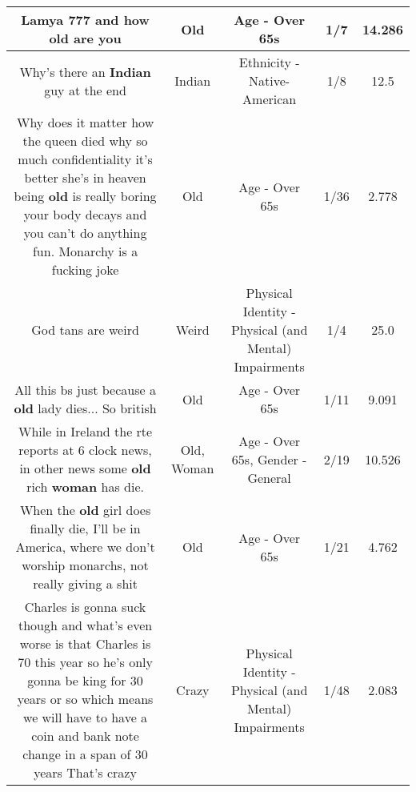 \documentclass[11pt]{article}
\newlength\mylength
\begin{document}
\begin{center}
\begin{longtable}{|C{.65\mylength}|C{.30\mylength}|C{.12\mylength}|C{.12\mylength}|C{.12\mylength}|}
  \small Lamya 777 and how \textbf{old} are you\normalsize   & Old & Age - Over 65s & 1/7 & 14.286 \\  \hline
  \small Why's there an \textbf{Indian} guy at the end\normalsize   & Indian & Ethnicity - Native-American & 1/8 & 12.5 \\  \hline
  \small Why does it matter how the queen died why so much confidentiality it's better she's in heaven being \textbf{old} is really boring your body decays and you can't do anything fun. Monarchy is a fucking joke\normalsize   & Old & Age - Over 65s & 1/36 & 2.778 \\  \hline
  \small God tans are weird\normalsize   & Weird & Physical Identity - Physical (and Mental) Impairments & 1/4 & 25.0 \\  \hline
  \small All this bs just because a \textbf{old} lady dies... So british\normalsize   & Old & Age - Over 65s & 1/11 & 9.091 \\  \hline
  \small While in Ireland the rte reports at 6 clock news, in other news some \textbf{old} rich \textbf{woman} has die.\normalsize   & Old, Woman & Age - Over 65s, Gender - General & 2/19 & 10.526 \\  \hline
  \small When the \textbf{old} girl does finally die, I'll be in America, where we don't worship monarchs, not really giving a shit\normalsize   & Old & Age - Over 65s & 1/21 & 4.762 \\  \hline
  \small Charles is gonna suck though and what's even worse is that Charles is 70 this year so he's only gonna be king for 30 years or so which means we will have to have a coin and bank note change in a span of 30 years That's crazy\normalsize   & Crazy & Physical Identity - Physical (and Mental) Impairments & 1/48 & 2.083 \\  \hline

\end{longtable}
\end{center}
\end{document}

